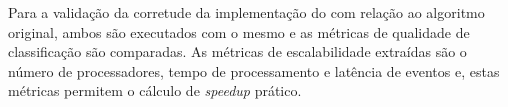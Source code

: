 




Para a validação da corretude da implementação do \mfog com relação ao algoritmo
\minas original, ambos são executados com o mesmo \dataset e as métricas de
qualidade de classificação são comparadas.
As métricas de escalabilidade extraídas são o número de processadores, tempo de
processamento e latência de eventos e, estas métricas permitem o cálculo de
\emph{speedup} prático.


